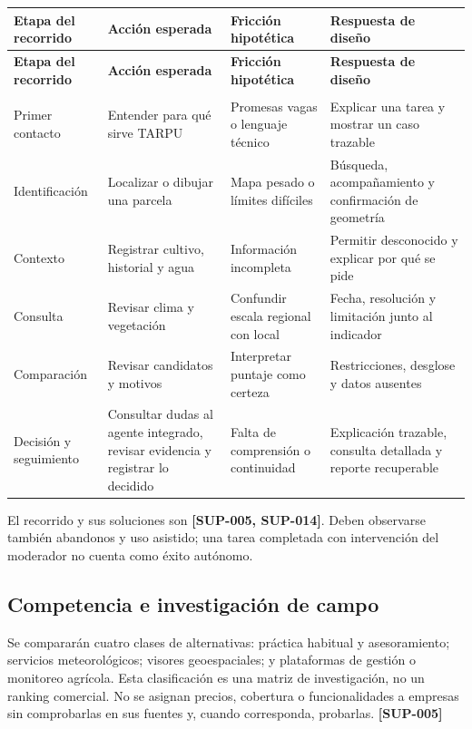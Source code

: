 \documentclass[10pt,a4paper]{article}
\begin{document}
\begingroup\small
\begin{longtable}{>{\raggedright\arraybackslash}p{3.115cm}>{\raggedright\arraybackslash}p{3.582cm}>{\raggedright\arraybackslash}p{4.517cm}>{\raggedright\arraybackslash}p{4.361cm}}
\toprule
\textbf{Etapa del recorrido} & \textbf{Acción esperada} & \textbf{Fricción hipotética} & \textbf{Respuesta de diseño} \\
\midrule\endfirsthead
\toprule
\textbf{Etapa del recorrido} & \textbf{Acción esperada} & \textbf{Fricción hipotética} & \textbf{Respuesta de diseño} \\
\midrule\endhead
\midrule\multicolumn{4}{r}{\scriptsize Continúa en la página siguiente}\\\endfoot
\bottomrule\endlastfoot
Primer contacto & Entender para qué sirve TARPU & Promesas vagas o lenguaje técnico & Explicar una tarea y mostrar un caso trazable \\[3pt]
Identificación & Localizar o dibujar una parcela & Mapa pesado o límites difíciles & Búsqueda, acompañamiento y confirmación de geometría \\[3pt]
Contexto & Registrar cultivo, historial y agua & Información incompleta & Permitir desconocido y explicar por qué se pide \\[3pt]
Consulta & Revisar clima y vegetación & Confundir escala regional con local & Fecha, resolución y limitación junto al indicador \\[3pt]
Comparación & Revisar candidatos y motivos & Interpretar puntaje como certeza & Restricciones, desglose y datos ausentes \\[3pt]
Decisión y seguimiento & Consultar dudas al agente integrado, revisar evidencia y registrar lo decidido & Falta de comprensión o continuidad & Explicación trazable, consulta detallada y reporte recuperable \\[3pt]
\end{longtable}
\endgroup

El recorrido y sus soluciones son \textbf{[SUP-005, SUP-014]}. Deben observarse también abandonos y uso asistido; una tarea completada con intervención del moderador no cuenta como éxito autónomo.


\subsection{Competencia e investigación de campo}

Se compararán cuatro clases de alternativas: práctica habitual y asesoramiento; servicios meteorológicos; visores geoespaciales; y plataformas de gestión o monitoreo agrícola. Esta clasificación es una matriz de investigación, no un ranking comercial. No se asignan precios, cobertura o funcionalidades a empresas sin comprobarlas en sus fuentes y, cuando corresponda, probarlas. \textbf{[SUP-005]}
\end{document}
